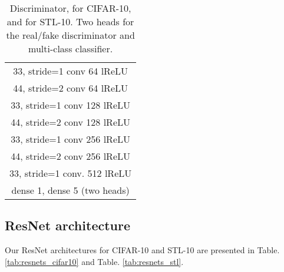 \documentclass{article}
\begin{document}
\begin{table}[ht!]
\begin{subtable}{.32\linewidth}
{\begin{tabular}{c}
			\midrule
            33, stride=1 conv 64 lReLU\\
            44, stride=2 conv 64 lReLU\\
            \midrule
            33, stride=1 conv 128 lReLU\\
            44, stride=2 conv 128 lReLU\\
            \midrule
            33, stride=1 conv 256 lReLU\\
            44, stride=2 conv 256 lReLU\\
            \midrule
            33, stride=1 conv. 512 lReLU\\
            \midrule
            dense  1, dense  5 (two heads)\\
			\bottomrule
		\end{tabular}}
        \caption{\label{tab:dis_deep}Discriminator,  for CIFAR-10, and  for STL-10. Two heads for the real/fake discriminator and multi-class classifier.}
    \end{subtable}
\end{table}

\subsection{ResNet architecture}

Our ResNet architectures for CIFAR-10 and STL-10 are presented in Table. \ref{tab:resnets_cifar10} and Table. \ref{tab:resnets_stl}.
\end{document}
